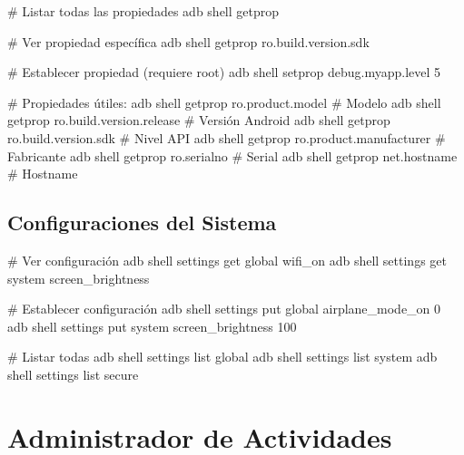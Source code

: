 \documentclass[
  doc,
  floatsintext,
  longtable,
  a4paper,
  nolmodern,
  notxfonts,
  notimes,
  12pt,
  colorlinks=true,linkcolor=blue,citecolor=blue,urlcolor=blue]{apa7}
\newenvironment{Shaded}{\begin{snugshade}}{\end{snugshade}}
\newcommand{\CommentTok}[1]{\textcolor[rgb]{0.37,0.37,0.37}{#1}}
\newcommand{\ExtensionTok}[1]{\textcolor[rgb]{0.00,0.23,0.31}{#1}}
\newcommand{\NormalTok}[1]{\textcolor[rgb]{0.00,0.23,0.31}{#1}}
\begin{document}
\begin{Shaded}
\begin{Highlighting}[]
\CommentTok{\# Listar todas las propiedades}
\ExtensionTok{adb}\NormalTok{ shell getprop}

\CommentTok{\# Ver propiedad específica}
\ExtensionTok{adb}\NormalTok{ shell getprop ro.build.version.sdk}

\CommentTok{\# Establecer propiedad (requiere root)}
\ExtensionTok{adb}\NormalTok{ shell setprop debug.myapp.level 5}

\CommentTok{\# Propiedades útiles:}
\ExtensionTok{adb}\NormalTok{ shell getprop ro.product.model           }\CommentTok{\# Modelo}
\ExtensionTok{adb}\NormalTok{ shell getprop ro.build.version.release   }\CommentTok{\# Versión Android}
\ExtensionTok{adb}\NormalTok{ shell getprop ro.build.version.sdk       }\CommentTok{\# Nivel API}
\ExtensionTok{adb}\NormalTok{ shell getprop ro.product.manufacturer    }\CommentTok{\# Fabricante}
\ExtensionTok{adb}\NormalTok{ shell getprop ro.serialno                }\CommentTok{\# Serial}
\ExtensionTok{adb}\NormalTok{ shell getprop net.hostname               }\CommentTok{\# Hostname}
\end{Highlighting}
\end{Shaded}

\subsection{Configuraciones del
Sistema}\label{configuraciones-del-sistema}

\begin{Shaded}
\begin{Highlighting}[]
\CommentTok{\# Ver configuración}
\ExtensionTok{adb}\NormalTok{ shell settings get global wifi\_on}
\ExtensionTok{adb}\NormalTok{ shell settings get system screen\_brightness}

\CommentTok{\# Establecer configuración}
\ExtensionTok{adb}\NormalTok{ shell settings put global airplane\_mode\_on 0}
\ExtensionTok{adb}\NormalTok{ shell settings put system screen\_brightness 100}

\CommentTok{\# Listar todas}
\ExtensionTok{adb}\NormalTok{ shell settings list global}
\ExtensionTok{adb}\NormalTok{ shell settings list system}
\ExtensionTok{adb}\NormalTok{ shell settings list secure}
\end{Highlighting}
\end{Shaded}

\section{Administrador de
Actividades}\label{administrador-de-actividades}
\end{document}
